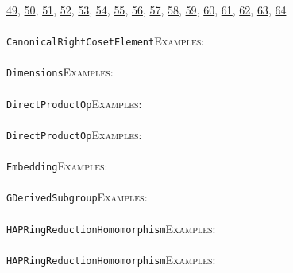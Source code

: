 \documentclass[a4paper,11pt]{report}
\begin{document}
{{\href{../www/SideLinks/About/aboutSpaceGroup.html} {49}{\nobreakspace}, \href{../www/SideLinks/About/aboutFunctorial.html} {50}{\nobreakspace}, \href{../www/SideLinks/About/aboutSuperperfect.html} {51}{\nobreakspace}, \href{../www/SideLinks/About/aboutGouter.html} {52}{\nobreakspace}, \href{../www/SideLinks/About/aboutSurvey.html} {53}{\nobreakspace}, \href{../www/SideLinks/About/aboutGraphsOfGroups.html} {54}{\nobreakspace}, \href{../www/SideLinks/About/aboutTDA.html} {55}{\nobreakspace}, \href{../www/SideLinks/About/aboutIntro.html} {56}{\nobreakspace}, \href{../www/SideLinks/About/aboutKnots.html} {57}{\nobreakspace}, \href{../www/SideLinks/About/aboutTensorSquare.html} {58}{\nobreakspace}, \href{../www/SideLinks/About/aboutKnotsQuandles.html} {59}{\nobreakspace}, \href{../www/SideLinks/About/aboutTopology.html} {60}{\nobreakspace}, \href{../www/SideLinks/About/aboutLieCovers.html} {61}{\nobreakspace}, \href{../www/SideLinks/About/aboutTorAndExt.html} {62}{\nobreakspace}, \href{../www/SideLinks/About/aboutLie.html} {63}{\nobreakspace}, \href{../www/SideLinks/About/aboutTwistedCoefficients.html} {64}{\nobreakspace} \\
 \\
 \texttt{CanonicalRightCosetElement}{\nobreakspace}{\nobreakspace}{\nobreakspace}{\nobreakspace}\textsc{Examples:} \\
 \\
 \texttt{Dimensions}{\nobreakspace}{\nobreakspace}{\nobreakspace}{\nobreakspace}\textsc{Examples:} \\
 \\
 \texttt{DirectProductOp}{\nobreakspace}{\nobreakspace}{\nobreakspace}{\nobreakspace}\textsc{Examples:} \\
 \\
 \texttt{DirectProductOp}{\nobreakspace}{\nobreakspace}{\nobreakspace}{\nobreakspace}\textsc{Examples:} \\
 \\
 \texttt{Embedding}{\nobreakspace}{\nobreakspace}{\nobreakspace}{\nobreakspace}\textsc{Examples:} \\
 \\
 \texttt{GDerivedSubgroup}{\nobreakspace}{\nobreakspace}{\nobreakspace}{\nobreakspace}\textsc{Examples:} \\
 \\
 \texttt{HAPRingReductionHomomorphism}{\nobreakspace}{\nobreakspace}{\nobreakspace}{\nobreakspace}\textsc{Examples:} \\
 \\
 \texttt{HAPRingReductionHomomorphism}{\nobreakspace}{\nobreakspace}{\nobreakspace}{\nobreakspace}\textsc{Examples:} \\
}}
\end{document}
